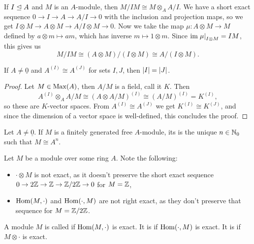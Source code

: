 \begin{example}
  If $I \trianglelefteq A$ and $M$ is an $A$-module, then $M / IM \cong M
  \otimes_A A/I$.
  We have a short exact sequence $0 \to I \to A \to A/I \to 0$ with the
  inclusion and projection maps, so we get
  $I \otimes M \to A \otimes M \to A/I \otimes M \to 0$.
  Now we take the map $\mu: A \otimes M \to M$ defined by $a \otimes m \mapsto
  am$, which has inverse $m \mapsto 1 \otimes m$.
  Since $\operatorname{im} \left. \mu \right|_{I \otimes M} = IM$, this gives us
  \[
	M / IM \cong (A \otimes M) / (I \otimes M) \cong A / (I \otimes M).
  \]
\end{example}

\begin{proposition}
  If $A \ne \underline{0}$ and $A^{(I)} \cong A^{(J)}$ for sets $I, J$, then
  $\left| I \right| = \left| J \right|$.
\end{proposition}

\begin{proof}
  Let $M \in \operatorname{Max}(A)$, then $A / M$ is a field, call it $K$.
  Then
  \[
	A^{(I)} \otimes_A A/M \cong (A \otimes A/M)^{(I)} \cong (A/M)^{(I)} =
	K^{(I)},
  \]
  so these are $K$-vector spaces.
  From $A^{(I)} \cong A^{(J)}$ we get $K^{(I)} \cong K^{(J)}$, and since the
  dimension of a vector space is well-defined, this concludes the proof.
\end{proof}

\begin{definition}
  Let $A \ne \underline{0}$.
  If $M$ is a finitely generated free $A$-module, its  is the unique
  $n \in \mathbb{N}_0$ such that $M \cong A^n$.
\end{definition}


Let $M$ be a module over some ring $A$.
Note the following:
\begin{itemize}
\item $\cdot \otimes M$ is not exact, as it doesn't preserve the short exact
  sequence $0 \to 2 \mathbb{Z} \to \mathbb{Z} \to \mathbb{Z} / 2 \mathbb{Z} \to 0$ for $M = \mathbb{Z}$,
\item $\operatorname{Hom}(M, \cdot)$ and $\operatorname{Hom}(\cdot, M)$ are not right exact, as they don't
  preserve that sequence for $M = \mathbb{Z} / 2 \mathbb{Z}$.
\end{itemize}

\begin{definition}
  A module $M$ is called  if $\operatorname{Hom}(M, \cdot)$ is exact.
  It is  if $\operatorname{Hom}(\cdot, M)$ is exact.
  It is  if $M \otimes \cdot$ is exact.
\end{definition}

